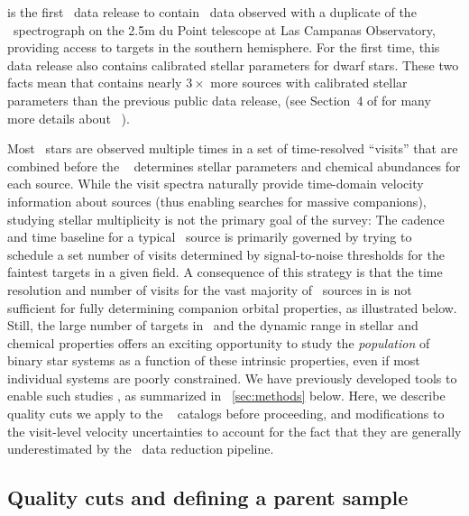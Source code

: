 \documentclass[modern]{aastex63}
\begin{document}
 is the first \sdss\ data release to contain \apogee\ data observed with
a duplicate of the \apogee\ spectrograph on the 2.5m du Point telescope at Las
Campanas Observatory, providing access to targets in the southern hemisphere.
For the first time, this data release also contains calibrated stellar
parameters for dwarf stars.
These two facts mean that  contains nearly $3\times$ more sources with
calibrated stellar parameters than the previous public data release, 
(see Section~4 of \citealt{DR16} for many more details about \apogee\ ).

Most \apogee\ stars are observed multiple times in a set of time-resolved
``visits'' that are combined before the \apogee\  determines
stellar parameters and chemical abundances for each source.
While the visit spectra naturally provide time-domain velocity information about
sources (thus enabling searches for massive companions), studying stellar
multiplicity is not the primary goal of the survey:
The cadence and time baseline for a typical \apogee\ source is primarily
governed by trying to schedule a set number of visits determined by
signal-to-noise thresholds for the faintest targets in a given field.
A consequence of this strategy is that the time resolution and number of visits
for the vast majority of \apogee\ sources in  is not sufficient for fully
determining companion orbital properties, as illustrated below.
Still, the large number of targets in \apogee\ and the dynamic range in stellar
and chemical properties offers an exciting opportunity to study the
\emph{population} of binary star systems as a function of these intrinsic
properties, even if most individual systems are poorly constrained.
We have previously developed tools to enable such studies \citep{thejoker}, as
summarized in \sectionname~\ref{sec:methods} below.
Here, we describe quality cuts we apply to the \apogee\  catalogs before
proceeding, and modifications to the visit-level velocity uncertainties to
account for the fact that they are generally underestimated by the \apogee\ data
reduction pipeline.


\subsection{Quality cuts and defining a parent sample}
\end{document}
